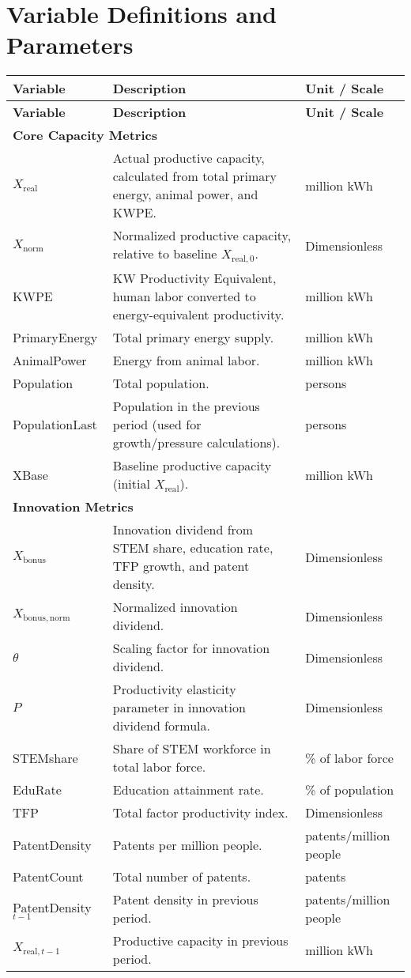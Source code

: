 \documentclass{article}
\begin{document}
\section{Variable Definitions and Parameters}

\setlength{\LTpre}{0pt}
\setlength{\LTpost}{0pt}

\begin{longtable}{p{3cm} p{8cm} p{3cm}}
\hline
\textbf{Variable} & \textbf{Description} & \textbf{Unit / Scale} \\
\hline
\endfirsthead
\hline
\textbf{Variable} & \textbf{Description} & \textbf{Unit / Scale} \\
\hline
\endhead

\multicolumn{3}{l}{\textbf{Core Capacity Metrics}} \\
$X_{\mathrm{real}}$ & Actual productive capacity, calculated from total primary energy, animal power, and KWPE. & million kWh \\
$X_{\mathrm{norm}}$ & Normalized productive capacity, relative to baseline $X_{\mathrm{real},0}$. & Dimensionless \\
KWPE & KW Productivity Equivalent, human labor converted to energy-equivalent productivity. & million kWh \\
PrimaryEnergy & Total primary energy supply. & million kWh \\
AnimalPower & Energy from animal labor. & million kWh \\
Population & Total population. & persons \\
PopulationLast & Population in the previous period (used for growth/pressure calculations). & persons \\
XBase & Baseline productive capacity (initial $X_{\mathrm{real}}$). & million kWh \\

\multicolumn{3}{l}{\textbf{Innovation Metrics}} \\
$X_{\mathrm{bonus}}$ & Innovation dividend from STEM share, education rate, TFP growth, and patent density. & Dimensionless \\
$X_{\mathrm{bonus,norm}}$ & Normalized innovation dividend. & Dimensionless \\
$\theta$ & Scaling factor for innovation dividend. & Dimensionless \\
$P$ & Productivity elasticity parameter in innovation dividend formula. & Dimensionless \\
STEMshare & Share of STEM workforce in total labor force. & \% of labor force \\
EduRate & Education attainment rate. & \% of population \\
TFP & Total factor productivity index. & Dimensionless \\
PatentDensity & Patents per million people. & patents/million people \\
PatentCount & Total number of patents. & patents \\
PatentDensity$_{t-1}$ & Patent density in previous period. & patents/million people \\
$X_{\mathrm{real},t-1}$ & Productive capacity in previous period. & million kWh \\


\end{longtable}
\end{document}
